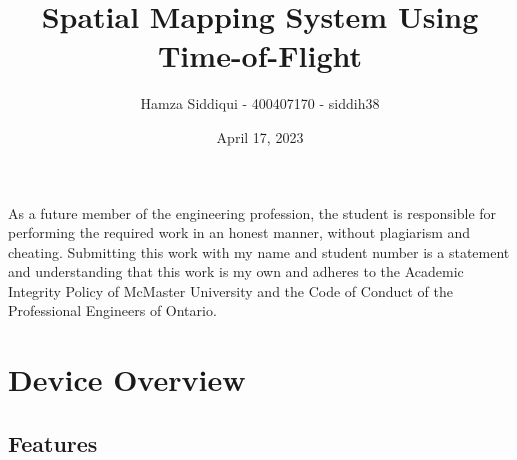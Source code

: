 \documentclass[12pt, letterpaper]{article}
\title{Spatial Mapping System Using Time-of-Flight}
\author{Hamza Siddiqui - 400407170 - siddih38 }
\date{April 17, 2023}
\begin{document}
\maketitle
As a future member of the engineering profession, the student is responsible for performing the required work in an honest manner, without plagiarism and cheating.
Submitting this work with my name and student number is a statement and understanding that this work is my own and adheres to the Academic Integrity Policy of McMaster University and the Code of Conduct of the Professional Engineers of Ontario.
\thispagestyle{fancy}

\newpage
\section{Device Overview}
\subsection{Features}
\end{document}
